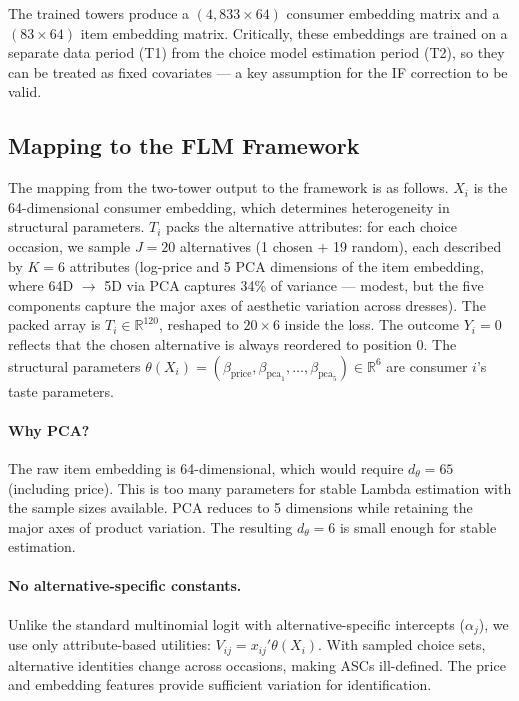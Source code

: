 The trained towers produce a $(4{,}833 \times 64)$ consumer embedding matrix and a $(83 \times 64)$ item embedding matrix. Critically, these embeddings are trained on a separate data period (T1) from the choice model estimation period (T2), so they can be treated as fixed covariates --- a key assumption for the IF correction to be valid.

\subsection{Mapping to the FLM Framework}\label{sec:mapping}

The mapping from the two-tower output to the \citet{farrell2025deep} framework is as follows. $X_i$ is the 64-dimensional consumer embedding, which determines heterogeneity in structural parameters. $T_i$ packs the alternative attributes: for each choice occasion, we sample $J = 20$ alternatives (1 chosen + 19 random), each described by $K = 6$ attributes (log-price and 5 PCA dimensions of the item embedding, where 64D $\to$ 5D via PCA captures 34\% of variance --- modest, but the five components capture the major axes of aesthetic variation across dresses). The packed array is $T_i \in \mathbb{R}^{120}$, reshaped to $20 \times 6$ inside the loss. The outcome $Y_i = 0$ reflects that the chosen alternative is always reordered to position 0. The structural parameters $\theta(X_i) = (\beta_{\text{price}}, \beta_{\text{pca}_1}, \ldots, \beta_{\text{pca}_5}) \in \mathbb{R}^6$ are consumer $i$'s taste parameters.

\paragraph{Why PCA?} The raw item embedding is 64-dimensional, which would require $d_\theta = 65$ (including price). This is too many parameters for stable Lambda estimation with the sample sizes available. PCA reduces to 5 dimensions while retaining the major axes of product variation. The resulting $d_\theta = 6$ is small enough for stable estimation.

\paragraph{No alternative-specific constants.} Unlike the standard multinomial logit with alternative-specific intercepts ($\alpha_j$), we use only attribute-based utilities: $V_{ij} = x_{ij}' \theta(X_i)$. With sampled choice sets, alternative identities change across occasions, making ASCs ill-defined. The price and embedding features provide sufficient variation for identification.

